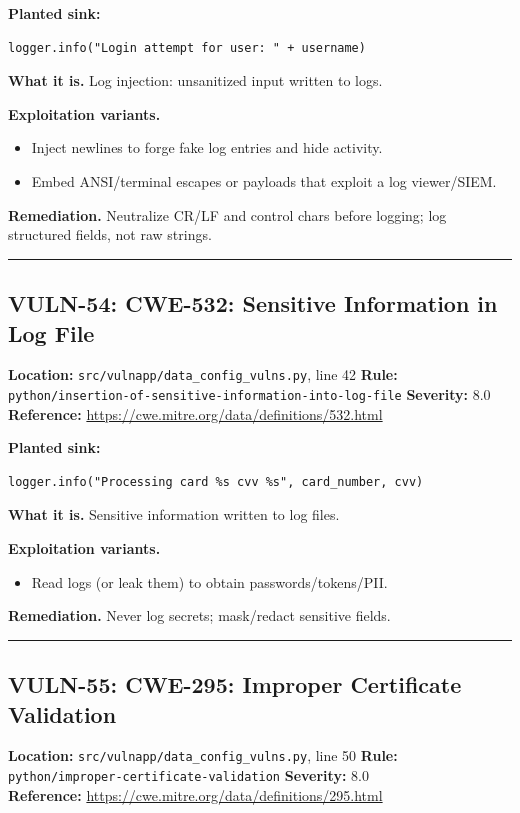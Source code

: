 \documentclass[11pt,a4paper]{article}
\begin{document}
\noindent\textbf{Planted sink:}
\begin{lstlisting}
logger.info("Login attempt for user: " + username)
\end{lstlisting}
\noindent\textbf{What it is.} Log injection: unsanitized input written to logs.

\noindent\textbf{Exploitation variants.}
\begin{itemize}[leftmargin=1.4em,itemsep=1pt,topsep=2pt]
\item Inject newlines to forge fake log entries and hide activity.
\item Embed ANSI/terminal escapes or payloads that exploit a log viewer/SIEM.
\end{itemize}
\noindent\textbf{Remediation.} Neutralize CR/LF and control chars before logging; log structured fields, not raw strings.

\vspace{4pt}\hrule\vspace{6pt}
\subsection{VULN-54: CWE-532: Sensitive Information in Log File}
\noindent\textbf{Location:} \texttt{src/vulnapp/data\_config\_vulns.py}, line 42 \quad \textbf{Rule:} \texttt{python/insertion-of-sensitive-information-into-log-file} \quad \textbf{Severity:} 8.0
\\ \textbf{Reference:} \url{https://cwe.mitre.org/data/definitions/532.html}

\noindent\textbf{Planted sink:}
\begin{lstlisting}
logger.info("Processing card %s cvv %s", card_number, cvv)
\end{lstlisting}
\noindent\textbf{What it is.} Sensitive information written to log files.

\noindent\textbf{Exploitation variants.}
\begin{itemize}[leftmargin=1.4em,itemsep=1pt,topsep=2pt]
\item Read logs (or leak them) to obtain passwords/tokens/PII.
\end{itemize}
\noindent\textbf{Remediation.} Never log secrets; mask/redact sensitive fields.

\vspace{4pt}\hrule\vspace{6pt}
\subsection{VULN-55: CWE-295: Improper Certificate Validation}
\noindent\textbf{Location:} \texttt{src/vulnapp/data\_config\_vulns.py}, line 50 \quad \textbf{Rule:} \texttt{python/improper-certificate-validation} \quad \textbf{Severity:} 8.0
\\ \textbf{Reference:} \url{https://cwe.mitre.org/data/definitions/295.html}
\end{document}
